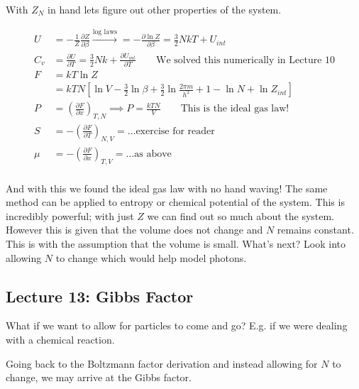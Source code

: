 \documentclass[10pt]{article}
\begin{document}
\begin{example}
	With $ Z_N $ in hand lets figure out other properties of the system.

	\begin{equation}
		\begin{split}
			U &= -\frac{1}{Z} \frac{\partial Z}{\partial \beta} \xrightarrow{\text{log laws}} = -\frac{\partial \ln{Z}}{\partial \beta} = \frac{3}{2} NkT + U_{int} \\
			C_v &= \frac{\partial U}{\partial T} = \frac{3}{2} Nk + \frac{\partial U_{int}}{\partial T}\qquad  \text{We solved this numerically in Lecture 10}  \\
			F &= kT \ln{Z} \\ 
				&= kTN \left[ \ln{V} - \frac{3}{2} \ln{\beta} + \frac{3}{2} \ln{\frac{2\pi m}{h^2}} + 1 - \ln{N} + \ln{Z_{int}} \right] \\
			P &=  \left(\frac{\partial F}{\partial x} \right)_{T, N}  \implies P = \frac{kTN}{V} \qquad \text{This is the ideal gas law!} \\
			S &= -\left(\frac{\partial F}{\partial T} \right)_{N, V} = \ldots \text{exercise for reader} \\
			\mu &= -\left(\frac{\partial F}{\partial x} \right)_{T, V} =\ldots \text{as above} \\
		\end{split}
	\end{equation}





	
	
\end{example}


	And with this we found the ideal gas law with no hand waving! 
	The same method can be applied to entropy or chemical potential of the system.
	This is incredibly powerful; with just $ Z $  we can find out so much about the system. However this is given that the volume does not change and $ N $ remains constant. This is with the assumption that the volume is small. 
	What's next? Look into allowing $ N $  to change which would help model photons.

\subsection{Lecture 13: Gibbs Factor}

What if we want to allow for particles to come and go? E.g. if we were dealing with a chemical reaction.


Going back to the Boltzmann factor derivation and instead allowing for $ N $  to change, we may arrive at the Gibbs factor.
\end{document}
